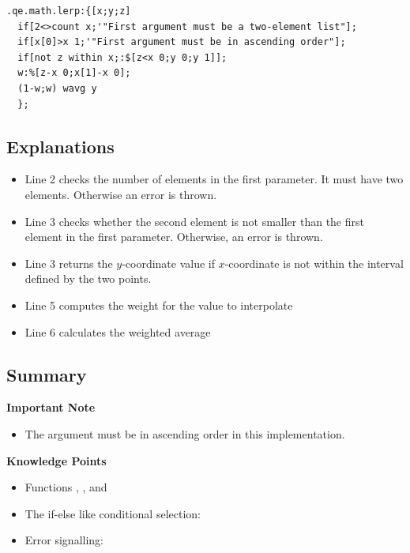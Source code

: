 \begin{verbatim}
.qe.math.lerp:{[x;y;z]
  if[2<>count x;'"First argument must be a two-element list"];
  if[x[0]>x 1;'"First argument must be in ascending order"];
  if[not z within x;:$[z<x 0;y 0;y 1]];
  w:%[z-x 0;x[1]-x 0];
  (1-w;w) wavg y
  };
\end{verbatim}

\subsection{Explanations}

\begin{itemize}
\item Line 2 checks the number of elements in the first parameter. It must have two elements. Otherwise an error is thrown.
\item Line 3 checks whether the second element is not smaller than the first element in the first parameter. Otherwise, an error is thrown.
\item Line 3 returns the $y$-coordinate value if $x$-coordinate is not within the interval defined by the two points.
\item Line 5 computes the weight for the value to interpolate
\item Line 6 calculates the weighted average
\end{itemize}


\subsection{Summary}

\begin{importantblock}
\textbf{Important Note}
\begin{itemize}
\item The argument  must be in ascending order in this implementation.
\end{itemize}
\end{importantblock}

\begin{noteblock}
\textbf{Knowledge Points}
\begin{itemize}
\item Functions \href{https://code.kx.com/q/ref/if/}{}, \href{https://code.kx.com/q/ref/count/}{}, \href{https://code.kx.com/q/ref/within/}{} and \href{https://code.kx.com/q/ref/wavg/}{} 
\item The if-else like conditional selection: \href{https://code.kx.com/q/ref/cond/}{\q{$}}
\item Error signalling: \href{https://code.kx.com/q/ref/signal/}{}
\end{itemize}
\end{noteblock}

\clearpage
